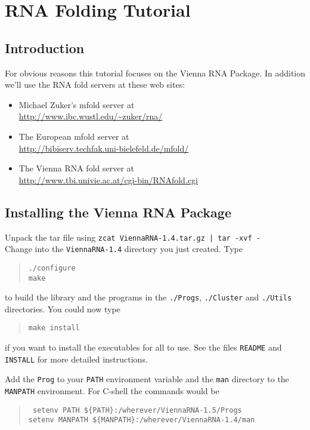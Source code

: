 \documentclass{article}
\begin{document}
\section{RNA Folding Tutorial}

\subsection{Introduction}

For obvious reasons this tutorial focuses on the Vienna RNA Package.
In addition we'll use the RNA fold servers at these web sites:
\begin{itemize}
\item Michael Zuker's mfold server at\\
\url{http://www.ibc.wustl.edu/~zuker/rna/}
\item The European mfold server at\\
\url{http://bibiserv.techfak.uni-bielefeld.de/mfold/}
\item The Vienna RNA fold server at\\
\url{http://www.tbi.univie.ac.at/cgi-bin/RNAfold.cgi}
\end{itemize}

\subsection{Installing the Vienna RNA Package}

Unpack the tar file using {\tt zcat ViennaRNA-1.4.tar.gz | tar -xvf -}\\
Change into the {\tt ViennaRNA-1.4} directory you just created.
Type
\begin{quote}
\tt ./configure\\
make
\end{quote}
to build the library and the programs in the {\tt ./Progs}, {\tt ./Cluster}
and {\tt ./Utils} directories. You could now type
\begin{quote}
\tt make install
\end{quote}
if you want to install the executables for all to use.
See the files {\tt README} and {\tt INSTALL} for more detailed instructions. 

Add the {\tt Prog} to your {\tt PATH} environment variable and the {\tt man}
directory to the {\tt MANPATH} environment. For C-shell the commands would
be
\begin{quote}\tt
setenv PATH \$\{PATH\}:/wherever/ViennaRNA-1.5/Progs\\
setenv MANPATH \$\{MANPATH\}:/wherever/ViennaRNA-1.4/man
\end{quote}
\end{document}
